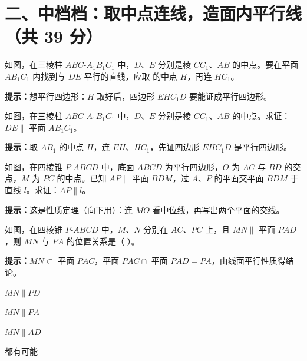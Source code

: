 \documentclass{exam-zh}
\begin{document}
\clearpage
\section*{二、中档档：取中点连线，造面内平行线（共 39 分）}


\begin{question}[points=7]
  如图，在三棱柱 $ABC$-$A_{1}B_{1}C_{1}$ 中，$D$、$E$ 分别是棱 $CC_{1}$、$AB$ 的中点。要在平面 $AB_{1}C_{1}$ 内找到与 $DE$ 平行的直线，应取 \underline{\hspace{3em}} 的中点 $H$，再连 $HC_{1}$。
  \begin{hintbox}
\textbf{提示：}想平行四边形：$H$ 取好后，四边形 $EHC_{1}D$ 要能证成平行四边形。\end{hintbox}

\end{question}



\begin{problem}[points=11]
    如图，在三棱柱 $ABC$-$A_{1}B_{1}C_{1}$ 中，$D$、$E$ 分别是棱 $CC_{1}$、$AB$ 的中点。求证：$DE\parallel$ 平面 $AB_{1}C_{1}$。

    \begin{hintbox}
\textbf{提示：}取 $AB_{1}$ 的中点 $H$，连 $EH$、$HC_{1}$，先证四边形 $EHC_{1}D$ 是平行四边形。\end{hintbox}

  \answerarea[65mm]
\end{problem}



\begin{problem}[points=11]
    如图，在四棱锥 $P$-$ABCD$ 中，底面 $ABCD$ 为平行四边形，$O$ 为 $AC$ 与 $BD$ 的交点，$M$ 为 $PC$ 的中点。已知 $AP\parallel$ 平面 $BDM$，过 $A$、$P$ 的平面交平面 $BDM$ 于直线 $l$。求证：$AP\parallel l$。

    \begin{hintbox}
\textbf{提示：}这是性质定理（向下用）：连 $MO$ 看中位线，再写出两个平面的交线。\end{hintbox}

  \answerarea[60mm]
\end{problem}



\begin{question}[points=10]
  如图，在四棱锥 $P$-$ABCD$ 中，$M$、$N$ 分别在 $AC$、$PC$ 上，且 $MN\parallel$ 平面 $PAD$，则 $MN$ 与 $PA$ 的位置关系是（    ）。
  \begin{hintbox}
\textbf{提示：}$MN\subset$ 平面 $PAC$，平面 $PAC\cap$ 平面 $PAD=PA$，由线面平行性质得结论。\end{hintbox}

  \begin{choices}
    \item $MN\parallel PD$
    \item $MN\parallel PA$
    \item $MN\parallel AD$
    \item 都有可能
  \end{choices}
\end{question}
\end{document}

